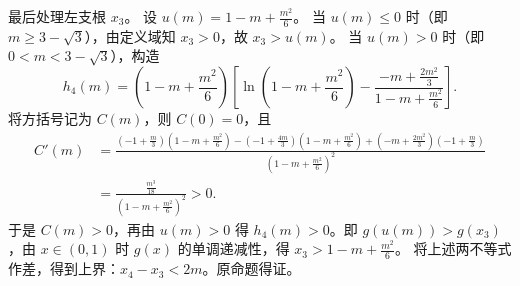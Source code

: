 \begin{solution}
最后处理左支根 $x_3$。
设 $u(m) = 1 - m + \frac{m^2}{6}$。
当 $u(m) \le 0$ 时（即 $m \ge 3 - \sqrt{3}$），由定义域知 $x_3 > 0$，故 $x_3 > u(m)$。
当 $u(m) > 0$ 时（即 $0 < m < 3 - \sqrt{3}$），构造
$$h_4(m) = (1 - m + \frac{m^2}{6})\left[ \ln(1 - m + \frac{m^2}{6}) - \frac{-m + \frac{2m^2}{3}}{1 - m + \frac{m^2}{6}} \right].$$
将方括号记为 $C(m)$，则 $C(0)=0$，且
\begin{align*}
C'(m)
&=\frac{\left(-1+\frac m3\right)\left(1-m+\frac{m^2}{6}\right)-\left(-1+\frac{4m}{3}\right)\left(1-m+\frac{m^2}{6}\right)+\left(-m+\frac{2m^2}{3}\right)\left(-1+\frac m3\right)}{\left(1-m+\frac{m^2}{6}\right)^2}\\
&=\frac{\frac{m^3}{18}}{\left(1-m+\frac{m^2}{6}\right)^2}>0.
\end{align*}
于是 $C(m)>0$，再由 $u(m)>0$ 得 $h_4(m)>0$。即 $g(u(m)) > g(x_3)$，由 $x \in (0,1)$ 时 $g(x)$ 的单调递减性，得 $x_3 > 1 - m + \frac{m^2}{6}$。
将上述两不等式作差，得到上界：$x_4 - x_3 < 2m$。原命题得证。
\end{solution}

